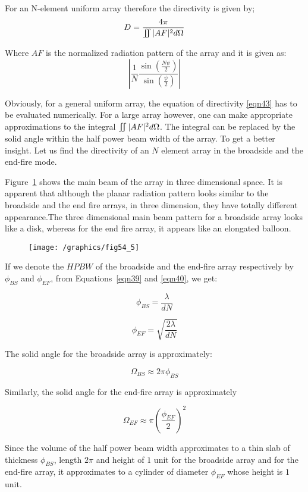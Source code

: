 For an N-element uniform array therefore the directivity is given by;
\begin{equation}
D = \frac{4 \pi}{\iint \arrowvert AF \arrowvert^2 d \Omega}
\label{eqn43}
\end{equation}

Where $AF$ is the normalized radiation pattern of the array and it is given as:
$$
\left\vert \frac{1}{N} \frac{\sin{(\frac{N \psi}{2})}}{\sin{(\frac{ \psi}{2})}} \right\vert
$$

Obviously, for a general uniform array, the equation of directivity \ref{eqn43} has to be evaluated numerically. For a large array however, one can make appropriate approximations to the integral $\iint \arrowvert AF \arrowvert^2 d \Omega$. The integral can be replaced by the solid angle within the half power beam width of the array. To get a better insight. Let us find the directivity of an $N$ element array in the broadside and the end-fire mode.

Figure~\ref{54.8} shows the main beam of the array in three dimensional space. It is apparent that although the planar radiation pattern looks similar to the broadside and the end fire arrays, in three dimension, they have totally different appearance.The three dimensional main beam pattern for a broadside array looks like a disk, whereas for the end fire array, it appears like an elongated balloon.

\begin{figure}[h]
\texttt{[image: /graphics/fig54\_5]}
\centering
\caption{}
\label{54.8}
\end{figure}

If we denote the $HPBW$ of the broadside and the end-fire array respectively by $\phi_{BS}$ and $\phi_{EF}$, from Equations~\ref{eqn39} and \ref{eqn40}, we get:

$$
\phi_{BS} = \frac{\lambda}{dN}
$$

$$
\phi_{EF} = \sqrt{\frac{2 \lambda}{dN}}
$$

The solid angle for the broadside array is approximately:

$$
\Omega_{BS} \approx 2 \pi \phi_{BS}
$$

Similarly, the solid angle for the end-fire array is approximately

$$
\Omega_{EF} \approx  \pi (\frac{\phi_{EF}}{2})^2
$$

Since the volume of the half power beam width approximates to a thin slab of thickness $\phi_{BS}$, length $2\pi$ and height of $1$ unit for the broadside array and for the end-fire array, it approximates to a cylinder of diameter $\phi_{EF}$ whose height is $1$ unit.

